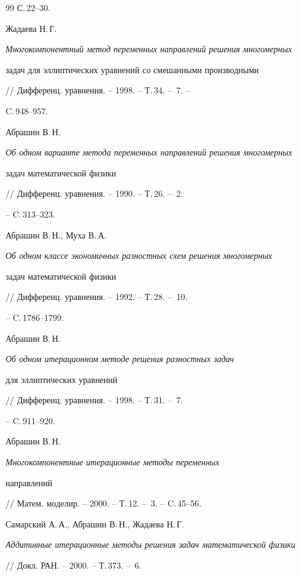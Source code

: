 \begin{thebibliography}{99}
С.\,22--30.




Жадаева Н.\,Г.


{\it Многокомпонентный метод переменных направлений решения многомерных


задач для эллиптических уравнений со смешанными производными}


// Дифференц. уравнения. -- 1998. -- Т.\,34. -- \No\,7. --


C.\,948--957.




Абрашин В.\,Н.


{\it Об одном варианте метода переменных направлений решения многомерных 


задач математической физики}


// Дифференц. уравнения. -- 1990. -- Т.\,26. -- \No\,2.


-- C.\,313--323.




Абрашин В.\,Н., Муха В.\,А.


{\it Об одном классе экономичных разностных схем решения многомерных


задач математической физики} 


// Дифференц. уравнения. -- 1992. -- Т.\,28. -- \No\,10. 


-- C.\,1786--1799.




Абрашин В.\,Н.


{\it Об одном итерационном методе решения разностных задач


для эллиптических уравнений}


// Дифференц. уравнения. -- 1998. -- Т.\,31. -- \No\,7.


-- C.\,911--920.




Абрашин В.\,Н.


{\it Многокомпонентные итерационные методы переменных


направлений}


// Матем. моделир. -- 2000. -- Т.\,12. -- \No\,3. -- C.\,45--56.




Самарский А.\,А., Абрашин В.\,Н., Жадаева Н.\,Г.


{\it Аддитивные итерационные методы решения задач математической физики}


// Докл. РАН. -- 2000. -- Т.\,373. -- \No\,6. %



\end{thebibliography}
